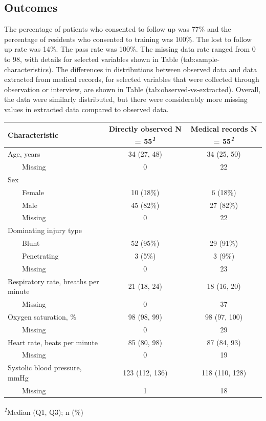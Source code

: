 \documentclass[
]{article}
\begin{document}
\hypertarget{outcomes-1}{%
\subsection{Outcomes}\label{outcomes-1}}

The percentage of patients who consented to follow up was 77\% and the percentage of residents who consented to training was 100\%. The lost to follow up rate was 14\%. The pass rate was 100\%. The missing data rate ranged from 0 to 98, with details for selected variables shown in Table (tab:sample-characteristics). The differences in distributions between observed data and data extracted from medical records, for selected variables that were collected through observation or interview, are shown in Table (tab:observed-vs-extracted). Overall, the data were similarly distributed, but there were considerably more missing values in extracted data compared to observed data.

\begingroup
\fontsize{12.0pt}{14.4pt}\selectfont
\setlength{\LTpost}{0mm}
\begin{longtable}{lcc}
\toprule
\textbf{Characteristic} & \textbf{Directly observed}  N = 55\textsuperscript{\textit{1}} & \textbf{Medical records}  N = 55\textsuperscript{\textit{1}} \\ 
\midrule\addlinespace[2.5pt]
Age, years & 34 (27, 48) & 34 (25, 50) \\ 
    Missing & 0 & 22 \\ 
Sex &  &  \\ 
    Female & 10 (18\%) & 6 (18\%) \\ 
    Male & 45 (82\%) & 27 (82\%) \\ 
    Missing & 0 & 22 \\ 
Dominating injury type &  &  \\ 
    Blunt & 52 (95\%) & 29 (91\%) \\ 
    Penetrating & 3 (5\%) & 3 (9\%) \\ 
    Missing & 0 & 23 \\ 
Respiratory rate, breaths per minute & 21 (18, 24) & 18 (16, 20) \\ 
    Missing & 0 & 37 \\ 
Oxygen saturation, \% & 98 (98, 99) & 98 (97, 100) \\ 
    Missing & 0 & 29 \\ 
Heart rate, beats per minute & 85 (80, 98) & 87 (84, 93) \\ 
    Missing & 0 & 19 \\ 
Systolic blood pressure, mmHg & 123 (112, 136) & 118 (110, 128) \\ 
    Missing & 1 & 18 \\ 
\bottomrule
\end{longtable}
\begin{minipage}{\linewidth}
\textsuperscript{\textit{1}}Median (Q1, Q3); n (\%)\\
\end{minipage}
\endgroup
\end{document}
